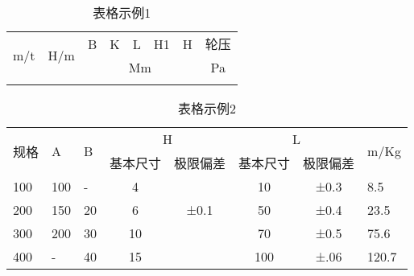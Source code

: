 \begin{table}[htbp]
  \centering\wuhao
  \caption{表格示例1}
  \vspace{0.5em}
  \begin{tabular}{cccccccc}
    \toprule
    \multicolumn{1}{c}{\multirow{2}[4]{*}{m/t}} & \multicolumn{1}{c}{\multirow{2}[4]{*}{H/m}} & \multicolumn{1}{p{4.0em}}{B}    & \multicolumn{1}{p{4.0em}}{K}  & \multicolumn{1}{p{4.0em}}{L} & \multicolumn{1}{p{4.0em}}{H1} & \multicolumn{1}{p{4.0em}}{H} & \multicolumn{1}{p{4.0em}}{轮压} \\
    \cmidrule{3-8}                              &                                             & \multicolumn{5}{p{20.95em}}{Mm} & \multicolumn{1}{p{4.0em}}{Pa}                                                                                                                                 \\
    \midrule
                                                &                                             & \multicolumn{5}{c}{}            &                                                                                                                                                               \\
    \bottomrule
  \end{tabular}%
  \label{tab:tbl-1-2}%
\end{table}%

\begin{table}[htbp]
  \centering\wuhao
  \caption{表格示例2}
  \vspace{0.5em}
  \begin{tabular}{p{2.6em}p{2.6em}p{2.6em}ccccp{3.2em}}
    \toprule
    \multirow{2}[4]{*}{规格} & \multirow{2}[4]{*}{A} & \multirow{2}[4]{*}{B} & \multicolumn{2}{c}{H} & \multicolumn{2}{c}{L} & \multirow{2}[4]{*}{m/Kg}                    \\
    \cmidrule{4-7}           &                       &                       & 基本尺寸              & 极限偏差              & 基本尺寸                 & 极限偏差 &       \\
    \midrule
    100                      & 100                   & -                     & 4                     &                       & 10                       & ±0.3     & 8.5   \\
    200                      & 150                   & 20                    & 6                     & ±0.1                  & 50                       & ±0.4     & 23.5  \\
    300                      & 200                   & 30                    & 10                    &                       & 70                       & ±0.5     & 75.6  \\
    400                      & -                     & 40                    & 15                    &                       & 100                      & ±.06     & 120.7 \\
    \bottomrule
  \end{tabular}%
  \label{tab:tbl-1-3}%
\end{table}%

